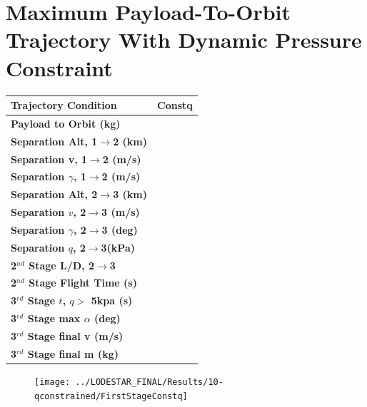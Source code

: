 		\chapter{Maximum Payload-To-Orbit Trajectory With Dynamic Pressure Constraint}\label{sec:Appendix_qconst}
	\begin{table}[ht]
	\centering
	\begin{tabular}{l c } 
		\hline \textbf{Trajectory Condition}
		& Constq

		\\
		\hline \textbf{Payload to Orbit (kg)}
		& \PayloadToOrbitqConstrained
		\\
		\textbf{Separation Alt, 1$\rightarrow$2 (km)}
		& \firstsecondSeparationAltqConstrained
		\\
		\textbf{Separation v, 1$\rightarrow$2 (m/s)}
		& \firstsecondSeparationvqConstrained
		\\
		\textbf{Separation $\gamma$, 1$\rightarrow$2 (m/s)}
		& \firstsecondSeparationgammaqConstrained
		\\
		\textbf{Separation Alt, 2$\rightarrow$3 (km)}
		& \secondthirdSeparationAltqConstrained
		\\
		\textbf{Separation $v$, 2$\rightarrow$3 (m/s)}
		& \secondthirdSeparationvqConstrained
		\\
		\textbf{Separation $\gamma$, 2$\rightarrow$3 (deg)}
		& \secondthirdSeparationgammaqConstrained
		\\
		\textbf{Separation $q$, 2$\rightarrow$3(kPa)}
		& \secondthirdSeparationqqConstrained
		\\
		\textbf{2$^{nd}$ Stage L/D, 2$\rightarrow$3}
		& \secondthirdSeparationLDqConstrained
		\\
		\textbf{2$^{nd}$ Stage Flight Time (s)}
		& \secondFlightTimeqConstrained
		\\
		\textbf{3$^{rd}$ Stage $t$, $q >$ 5kpa (s)}
		& \thirdqOverFiveqConstrained
		\\
		\textbf{3$^{rd}$ Stage max $\alpha$ (deg)}
		& \thirdmaxAoAqConstrained
		\\
		\textbf{3$^{rd}$ Stage final v (m/s)}
		& \thirdcircvqConstrained
		\\
		\textbf{3$^{rd}$ Stage final m (kg)}
		& \thirdcircmqConstrained
		\\
		\hline 
	\end{tabular} 
	\end{table}
		
\begin{figure}[th]
\centering
\texttt{[image: ../LODESTAR\_FINAL/Results/10-qconstrained/FirstStageConstq]}
\caption{}
\label{fig:FirstStageqConstrained68}
\end{figure}
		
